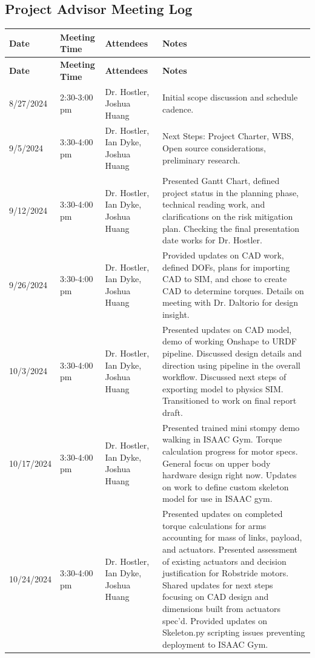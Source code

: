 \documentclass{article}
\begin{document}
\subsection{Project Advisor Meeting Log}

\begin{longtable}{|>{\raggedright}m{2.5cm}|>{\raggedright}m{2.5cm}|>{\raggedright}m{4cm}|>{\raggedright\arraybackslash}m{6cm}|}
\hline
\textbf{Date} & \textbf{Meeting Time} & \textbf{Attendees} & \textbf{Notes} \\ \hline
\endfirsthead
\hline
\textbf{Date} & \textbf{Meeting Time} & \textbf{Attendees} & \textbf{Notes} \\ \hline
\endhead
8/27/2024 & 2:30-3:00 pm & Dr. Hostler, Joshua Huang & Initial scope discussion and schedule cadence. \\ \hline
9/5/2024 & 3:30-4:00 pm & Dr. Hostler, Ian Dyke, Joshua Huang & Next Steps: Project Charter, WBS, Open source considerations, preliminary research. \\ \hline
9/12/2024 & 3:30-4:00 pm & Dr. Hostler, Ian Dyke, Joshua Huang & Presented Gantt Chart, defined project status in the planning phase, technical reading work, and clarifications on the risk mitigation plan. Checking the final presentation date works for Dr. Hostler. \\ \hline
9/26/2024 & 3:30-4:00 pm & Dr. Hostler, Ian Dyke, Joshua Huang & Provided updates on CAD work, defined DOFs, plans for importing CAD to SIM, and chose to create CAD to determine torques. Details on meeting with Dr. Daltorio for design insight. \\ \hline
10/3/2024 & 3:30-4:00 pm & Dr. Hostler, Ian Dyke, Joshua Huang & Presented updates on CAD model, demo of working Onshape to URDF pipeline. Discussed design details and direction using pipeline in the overall workflow. Discussed next steps of exporting model to physics SIM. Transitioned to work on final report draft. \\ \hline
10/17/2024 & 3:30-4:00 pm & Dr. Hostler, Ian Dyke, Joshua Huang & Presented trained mini stompy demo walking in ISAAC Gym. Torque calculation progress for motor specs. General focus on upper body hardware design right now. Updates on work to define custom skeleton model for use in ISAAC gym. \\ \hline
10/24/2024 & 3:30-4:00 pm & Dr. Hostler, Ian Dyke, Joshua Huang & Presented updates on completed torque calculations for arms accounting for mass of links, payload, and actuators. Presented assessment of existing actuators and decision justification for Robstride motors. Shared updates for next steps focusing on CAD design and dimensions built from actuators spec’d. Provided updates on Skeleton.py scripting issues preventing deployment to ISAAC Gym. \\ \hline

\end{longtable}
\end{document}
